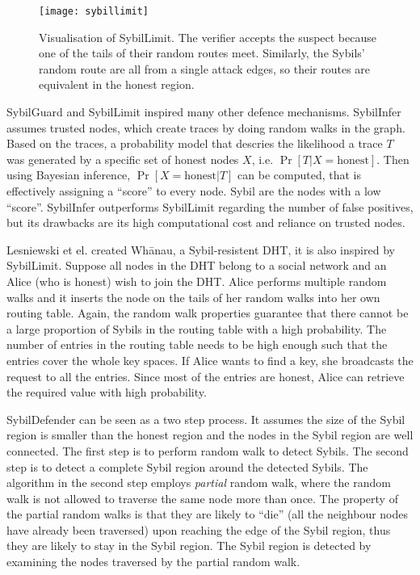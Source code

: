 \begin{figure}
  \centering
  \texttt{[image: sybillimit]}
  \caption{Visualisation of SybilLimit. The verifier accepts the suspect because
    one of the tails of their random routes meet. Similarly, the Sybils' random
    route are all from a single attack edges, so their routes are equivalent in
    the honest region.}
  \label{fig:sybillimit}
\end{figure}

SybilGuard and SybilLimit inspired many other defence mechanisms.
SybilInfer\cite{danezis2009sybilinfer} assumes trusted nodes, which create
traces by doing random walks in the graph. Based on the traces, a probability
model that descries the likelihood a trace $T$ was generated by a specific set
of honest nodes $X$, i.e. $\Pr[ T | X = \text{honest}]$. Then using Bayesian
inference, $\Pr[ X = \text{honest}| T ]$ can be computed, that is effectively
assigning a ``score'' to every node. Sybil are the nodes with a low ``score''.
SybilInfer outperforms SybilLimit regarding the number of false positives, but
its drawbacks are its high computational cost and reliance on trusted nodes.

Lesniewski et el. created Wh\={a}nau, a Sybil-resistent DHT, it is also inspired
by SybilLimit\cite{lesniewski2008sybil, lesniewski2010whanau}. Suppose all nodes
in the DHT belong to a social network and an Alice (who is honest) wish to join
the DHT. Alice performs multiple random walks and it inserts the node on the
tails of her random walks into her own routing table. Again, the random walk
properties guarantee that there cannot be a large proportion of Sybils in the
routing table with a high probability. The number of entries in the routing
table needs to be high enough such that the entries cover the whole key spaces.
If Alice wants to find a key, she broadcasts the request to all the entries.
Since most of the entries are honest, Alice can retrieve the required value with
high probability.

SybilDefender\cite{wei2012sybildefender} can be seen as a two step process. It
assumes the size of the Sybil region is smaller than the honest region and the
nodes in the Sybil region are well connected. The first step is to perform
random walk to detect Sybils. The second step is to detect a complete Sybil
region around the detected Sybils. The algorithm in the second step employs
\emph{partial} random walk, where the random walk is not allowed to traverse the
same node more than once. The property of the partial random walks is that they
are likely to ``die'' (all the neighbour nodes have already been traversed) upon
reaching the edge of the Sybil region, thus they are likely to stay in the Sybil
region. The Sybil region is detected by examining the nodes traversed by the
partial random walk.

